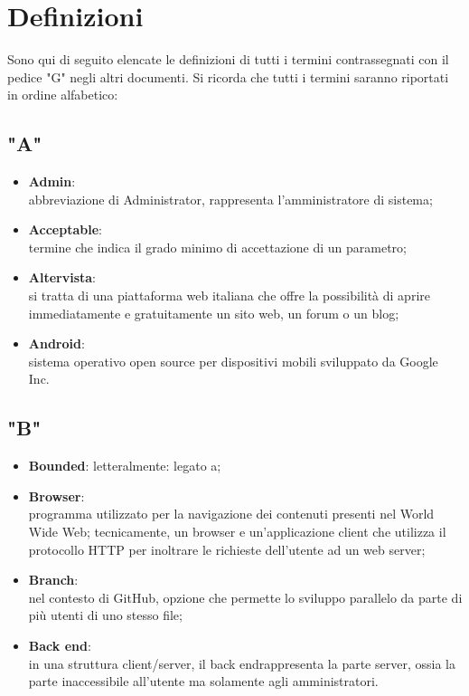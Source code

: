 \section{Definizioni}
Sono qui di seguito elencate le definizioni di tutti i termini contrassegnati con il pedice "G" negli altri documenti.
Si ricorda che tutti i termini saranno riportati in ordine alfabetico:

\subsection{"A"}
\begin{itemize}
\item \textbf{Admin}:\\ abbreviazione di Administrator, rappresenta l'amministratore di sistema;
\item \textbf{Acceptable}:\\ termine che indica il grado minimo di accettazione di un parametro;
\item \textbf{Altervista}:\\ si tratta di una piattaforma web italiana che offre la possibilità di aprire immediatamente e gratuitamente un sito web, un forum o un blog;
\item \textbf{Android}:\\ sistema operativo open source per dispositivi mobili sviluppato da Google Inc.
\end{itemize}
\subsection{"B"}
\begin{itemize}
\item \textbf{Bounded}: letteralmente: legato a;
\item \textbf{Browser}:\\ programma utilizzato per la navigazione dei contenuti presenti nel World Wide Web;
tecnicamente, un browser e un’applicazione client che utilizza il protocollo HTTP per inoltrare le richieste dell’utente ad un web server;
\item \textbf{Branch}:\\ nel contesto di GitHub, opzione che permette lo sviluppo parallelo da parte di più utenti di uno stesso file;
\item \textbf{Back end}:\\ in una struttura client/server, il back endrappresenta la parte server, ossia la parte inaccessibile all'utente ma solamente agli amministratori.
\end{itemize}
